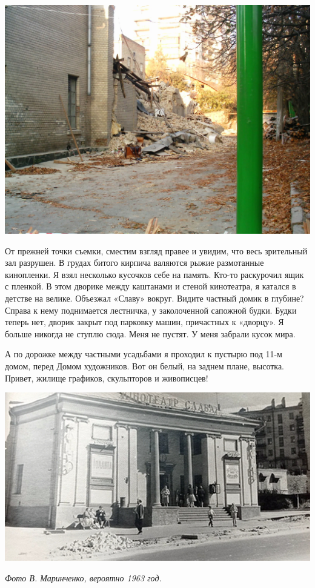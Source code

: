 \begin{center}
\includegraphics[width=\linewidth]{chast-vosp/zver/slava-01.jpg}
\end{center}

От прежней точки съемки, сместим взгляд правее и увидим, что весь зрительный зал разрушен. В грудах битого кирпича валяются рыжие размотанные кинопленки. Я взял несколько кусочков себе на память. Кто-то раскурочил ящик с пленкой. В этом дворике между каштанами и стеной кинотеатра, я катался в детстве на велике. Объезжал «Славу» вокруг. Видите частный домик в глубине? Справа к нему поднимается лестничка, у заколоченной сапожной будки. Будки теперь нет, дворик закрыт под парковку машин, причастных к «дворцу». Я больше никогда не ступлю сюда. Меня не пустят. У меня забрали кусок мира.
 
А по дорожке между частными усадьбами я проходил к пустырю под 11-м домом, перед Домом художников. Вот он белый, на заднем плане, высотка. Привет, жилище графиков, скульпторов и живописцев!

\newpage

\vspace*{\fill}

\begin{center}
\includegraphics[width=\linewidth]{chast-vosp/zver/slava63.jpg}

\textit{Фото В. Маринченко, вероятно 1963 год.}
\end{center}

